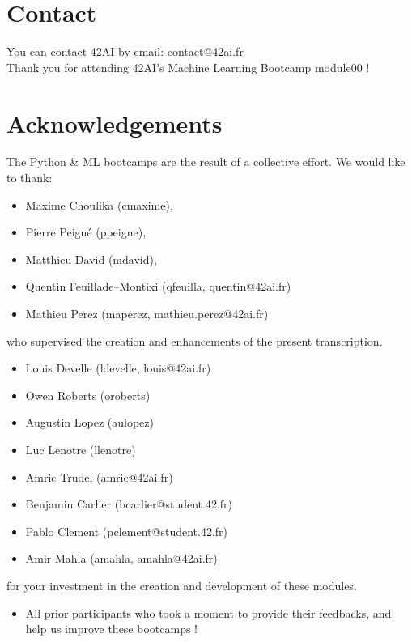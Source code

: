 \section*{Contact}
You can contact 42AI by email: \href{mailto:contact@42ai.fr}{contact@42ai.fr}\\
\newline
Thank you for attending 42AI's Machine Learning Bootcamp module00 !

\section*{Acknowledgements}
The Python \& ML bootcamps are the result of a collective effort. We would like to thank:\\
\begin{itemize}
  \item Maxime Choulika (cmaxime),
  \item Pierre Peigné (ppeigne),
  \item Matthieu David (mdavid),
  \item Quentin Feuillade--Montixi (qfeuilla, quentin@42ai.fr)
  \item Mathieu Perez (maperez, mathieu.perez@42ai.fr)
\end{itemize}
who supervised the creation and enhancements of the present transcription.\\
\begin{itemize}
  \item Louis Develle (ldevelle, louis@42ai.fr)
  \item Owen Roberts (oroberts)
  \item Augustin Lopez (aulopez)
  \item Luc Lenotre (llenotre)
  \item Amric Trudel (amric@42ai.fr)
  \item Benjamin Carlier (bcarlier@student.42.fr)
  \item Pablo Clement (pclement@student.42.fr)
  \item Amir Mahla (amahla, amahla@42ai.fr)
\end{itemize}
for your investment in the creation and development of these modules.\\
\begin{itemize}
    \item All prior participants who took a moment to provide their feedbacks, and help us improve these bootcamps !
  \end{itemize}

\vfill
\doclicenseThis
